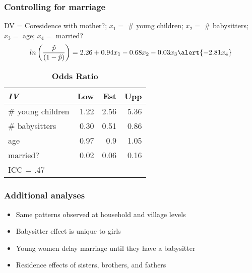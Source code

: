 \documentclass{beamer}
\begin{document}
\begin{frame}
\frametitle{Controlling for marriage}

DV = Coresidence with mother?;
$x_1 =$ \# young children; $x_2 =$ \# babysitters; $x_3 =$ age; \alert{$x_4 =$ married?} 
\begin{equation*}
ln\left(\frac{\hat{p}}{(1 - \hat{p})}\right) = 2.26 + 0.94x_{1} - 0.68x_{2} - 0.03x_{3} \alert{- 2.81x_{4}}
\end{equation*}

\begin{table}[h]
\caption {\textbf{Odds Ratio}}
  \centering
  \begin{tabular}{| l | r r r|} 
  	\hline
	\emph{IV} & Low & Est & Upp \\ \hline
	\# young children & 1.22& 2.56 & 5.36\\
	\# babysitters & 0.30 & 0.51 & 0.86\\
	age & 0.97 & 0.9 & 1.05\\
	married? & \alert{0.02} & \alert{0.06} & \alert{0.16}\\\hline
	\multicolumn{4}{l}{ICC = .47}\\ 
  \end{tabular}
\end{table}
\end{frame}




\begin{frame}
\frametitle{Additional analyses}
\begin{itemize}
\item Same patterns observed at household and village levels
\vspace{0.5cm}
\item Babysitter effect is unique to girls
\vspace{0.5cm}
\item Young women delay marriage until they have a babysitter
\vspace{0.5cm}
\item Residence effects of sisters, brothers, and fathers
\end{itemize}
\end{frame}
\end{document}
